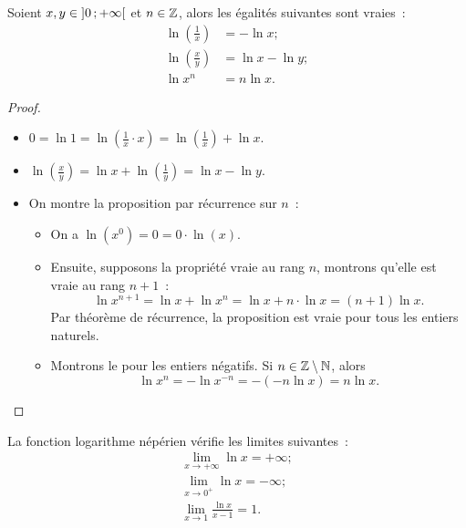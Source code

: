 %
\begin{prop}
  Soient \(x, y \in \left] 0 \, ;  +\infty \right[\) et \(n \in \mathbb{Z}\), alors les égalités suivantes sont vraies~:
  \begin{align}
      \ln \left(\frac{1}{x}\right)&=-\ln x;\\
      \ln \left(\frac{x}{y}\right)&=\ln x - \ln y; \\
      \ln x^n&=n\ln x.
  \end{align}
\end{prop}
\begin{proof}
  \begin{itemize}
  \item \( 0 = \ln 1 = \ln \left(\frac{1}{x} \cdot x \right) = \ln \left(\frac{1}{x}\right) + \ln x \).
  \item \( \ln \left(\frac{x}{y}\right)=\ln x + \ln \left(\frac{1}{y}\right)=\ln x - \ln y\).
  \item On montre la proposition par récurrence sur \(n\)~:
    \begin{itemize}
    \item On a \(\ln(x^0) = 0 = 0 \cdot \ln(x)\).
    \item Ensuite, supposons la propriété vraie au rang \(n\), montrons qu'elle est vraie au rang \(n+1\)~:
      \begin{equation}
        \ln x^{n+1} = \ln x + \ln x^n = \ln x + n \cdot \ln x = (n+1) \ln x.
      \end{equation}
      Par théorème de récurrence, la proposition est vraie pour tous les entiers naturels.
    \item Montrons le pour les entiers négatifs. Si \(n \in \mathbb{Z}\setminus\mathbb{N}\), alors
      \begin{equation}
        \ln x^n = -\ln x^{-n}=-(-n\ln x)=n\ln x.
      \end{equation}
    \end{itemize}
  \end{itemize}
\end{proof}
%
\begin{theo}
\label{theo:limln}
  La fonction logarithme népérien vérifie les limites suivantes~:
  \begin{gather}
    \lim\limits_{x \to + \infty} \ln x = +\infty; \\
    \lim\limits_{x \to 0^{+}} \ln x = -\infty;\\
    \lim\limits_{x \to 1} \frac{\ln x}{x-1}=1.
  \end{gather}
\end{theo}
